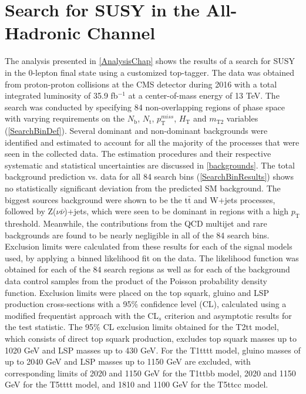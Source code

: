 \section{Search for SUSY in the All-Hadronic Channel}

The analysis presented in \autoref{AnalysisChap} shows the results of a search for SUSY in the 0-lepton final state using a customized top-tagger. The data was obtained from proton-proton collisions at the CMS detector during 2016 with a total integrated luminosity of 35.9 fb$^{-1}$ at a center-of-mass energy of 13 TeV. The search was conducted by specifying 84 non-overlapping regions of phase space with varying requirements on the $N_\text{b}$, $N_\text{t}$, $p_{\text{T}}^{miss}$, $H_\text{T}$ and $m_\text{T2}$ variables (\autoref{SearchBinDef}). Several dominant and non-dominant backgrounds were identified and estimated to account for all the majority of the processes that were seen in the collected data. The estimation procedures and their respective systematic and statistical uncertainties are discussed in \autoref{backgrounds}. The total background prediction vs. data for all 84 search bins (\autoref{SearchBinResults}) shows no statistically significant deviation from the predicted SM background. The biggest sources background were shown to be the t$\bar{\text{t}}$ and W+jets processes, followed by Z($\nu\bar{\nu}$)+jets, which were seen to be dominant in regions with a high $p_\text{T}$ threshold. Meanwhile, the contributions from the QCD multijet and rare backgrounds are found to be nearly negligible in all of the 84 search bins. Exclusion limits were calculated from these results for each of the signal models used, by applying a binned likelihood fit on the data. The likelihood function was obtained for each of the 84 search regions as well as for each of the background data control samples from the product of the Poisson probability density function. Exclusion limits were placed on the top squark, gluino and LSP production cross-sections with a 95\% confidence level (CL), calculated using a modified frequentist approach with the CL$_s$ criterion and asymptotic results for the test statistic. The 95\% CL exclusion limits obtained for the T2tt model, which consists of direct top squark production, excludes top squark masses up to 1020 GeV and LSP masses up to 430 GeV. For the T1tttt model, gluino masses of up to 2040 GeV and LSP masses up to 1150 GeV are excluded, with corresponding limits of 2020 and 1150 GeV for the T1ttbb model, 2020 and 1150 GeV for the T5tttt model, and 1810 and 1100 GeV for the T5ttcc model. 

